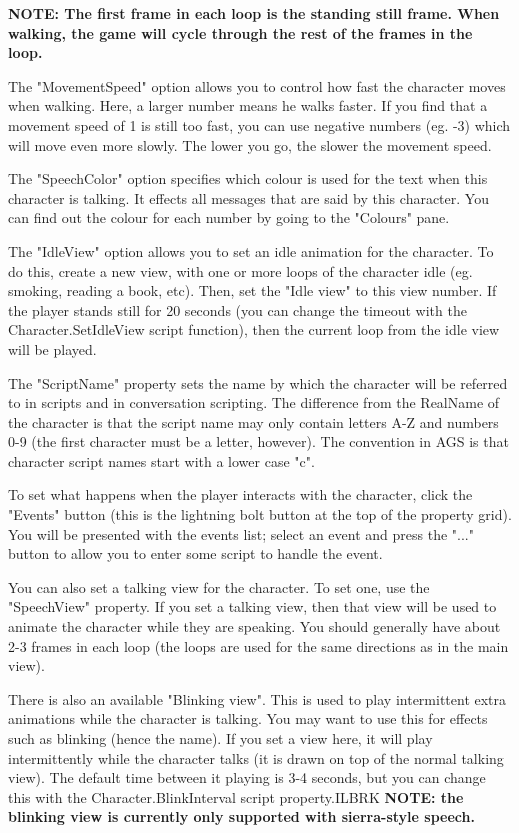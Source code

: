\bf{NOTE:} The first frame in each loop is the standing still frame. When walking, the
game will cycle through the rest of the frames in the loop.

The "MovementSpeed" option allows you to control how fast the character moves when
walking. Here, a larger number means he walks faster. If you find that a movement
speed of 1 is still too fast, you can use negative numbers (eg. -3) which will move
even more slowly. The lower you go, the slower the movement speed.

The "SpeechColor" option specifies which colour is used for the text when
this character is talking. It effects all messages that are said by this
character. You can find out the colour for each number by going
to the "Colours" pane.

The "IdleView" option allows you to set an idle animation for the character.
To do this, create a new view, with one or more loops of the character idle
(eg. smoking, reading a book, etc). Then, set the "Idle view" to this view number.
If the player stands still for 20 seconds (you can change the timeout with
the Character.SetIdleView script function), then the current loop
from the idle view will be played.

The "ScriptName" property sets the name by which the character will be
referred to in scripts and in conversation scripting.
The difference from the RealName of the character is that the script name
may only contain letters A-Z and numbers 0-9 (the first character must be
a letter, however). The convention in AGS is that character script names
start with a lower case "c".

To set what happens when the player interacts with the character, click the
"Events" button (this is the lightning bolt button at the top of the property
grid). You will be presented with the events list; select an event and
press the "..." button to allow you to enter some script to handle the event.

You can also set a talking view for the character. To set one, use the
"SpeechView" property. If you set a talking view, then that view will be
used to animate the character while they are speaking. You should generally
have about 2-3 frames in each loop (the loops are used for
the same directions as in the main view).

There is also an available "Blinking view". This is used to play intermittent extra
animations while the character is talking. You may want to use this for effects
such as blinking (hence the name).  If you set a view here, it will play intermittently
while the character talks (it is drawn on top of the normal talking view). The default
time between it playing is 3-4 seconds, but you can change this with the Character.BlinkInterval
script property.ILBRK
\bf{NOTE}: the blinking view is currently only supported with sierra-style speech.

